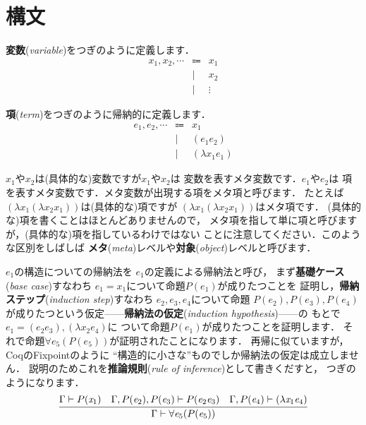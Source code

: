 \documentclass{ltjsbook}%
\newcommand\term[2]{\textbf{#1}{(\textit{#2})}}%
\begin{document}
\section{構文}%
\label{untyped:syntax}%
\par\term{変数}{variable}をつぎのように定義します．%
\begin{equation}%
  \begin{array}{lrl}%
    \mathit{x}_1,\mathit{x}_2,\cdots%
    & \Coloneqq & x_1\\%
    &         | & x_2\\%
    &         | & \vdots%
  \end{array}%
\end{equation}%
\par\term{項}{term}をつぎのように帰納的に定義します．%
\begin{equation}%
  \begin{array}{lrl}%
    \mathit{e}_1,\mathit{e}_2,\cdots%
    & \Coloneqq & \mathit{x}_1\\%
    &         | & (\mathit{e}_1\mathit{e}_2)\\%
    &         | & (\lambda\mathit{x}_1\mathit{e}_1)%
  \end{array}%
\end{equation}%
\par$x_1$や$x_2$は(具体的な)変数ですが$\mathit{x}_1$や$\mathit{x}_2$は%
変数を表すメタ変数です．$\mathit{e}_1$や$\mathit{e}_2$は%
項を表すメタ変数です．メタ変数が出現する項をメタ項と呼びます．%
たとえば$(\lambda x_1(\lambda x_2x_1))$は(具体的な)項ですが%
$(\lambda\mathit{x}_1(\lambda\mathit{x}_2\mathit{x}_1))$はメタ項です．%
(具体的な)項を書くことはほとんどありませんので，%
メタ項を指して単に項と呼びますが，(具体的な)項を指しているわけではない%
ことに注意してください．このような区別をしばしば%
\term{メタ}{meta}レベルや\term{対象}{object}レベルと呼びます．%
\par$\mathit{e}_1$の構造についての帰納法を%
$\mathit{e}_1$の定義による帰納法と呼び，%
まず\term{基礎ケース}{base case}すなわち%
$\mathit{e}_1 = \mathit{x}_1$について命題$P(\mathit{e}_1)$が成りたつことを%
証明し，\term{帰納ステップ}{induction step}すなわち%
$\mathit{e}_2,\mathit{e}_3,\mathit{e}_4$について命題%
$P(\mathit{e}_2),P(\mathit{e}_3),P(\mathit{e}_4)$%
が成りたつという仮定------\term{帰納法の仮定}{induction hypothesis}------の%
もとで%
$\mathit{e}_1 = (\mathit{e}_2\mathit{e}_3),(\lambda\mathit{x}_2\mathit{e}_4)$に%
ついて命題$P(\mathit{e}_1)$が成りたつことを証明します．%
それで命題$\forall\mathit{e}_5(P(\mathit{e}_5))$が証明されたことになります．%
再帰に似ていますが，CoqのFixpointのように%
``構造的に小さな''ものでしか帰納法の仮定は成立しません．%
説明のためこれを\term{推論規則}{rule of inference}として書きくだすと，%
つぎのようになります．%
\begin{equation}%
  \infer{%
    \Gamma\vdash\forall\mathit{e}_5(P(\mathit{e}_5))%
  }{%
    \Gamma\vdash P(\mathit{x}_1)%
  &%
    \Gamma,P(\mathit{e}_2),P(\mathit{e}_3)\vdash P(\mathit{e}_2\mathit{e}_3)%
  &%
    \Gamma,P(\mathit{e}_4)\vdash (\lambda\mathit{x}_1\mathit{e}_4)%
  }%
\end{equation}%
\end{document}
